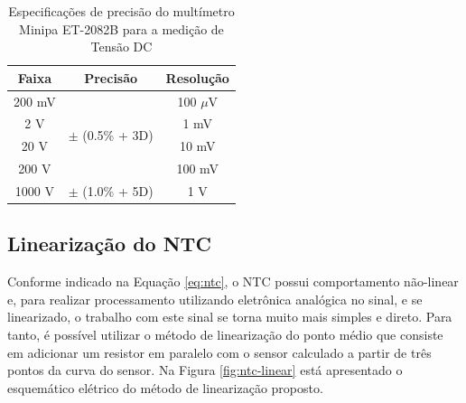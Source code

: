 \documentclass[a4paper]{instrumentacao}
\begin{document}
\begin{table}[H]
\centering
\caption{Especificações de precisão do multímetro Minipa ET-2082B para a medição de Tensão DC}
\label{tab:precisão-multimetro}
\begin{tabular}{|c|c|c|}
\hline
\textbf{Faixa} & \textbf{Precisão} & \textbf{Resolução} \\ \hline
200 mV         & \multirow{4}{*}{$\pm$ (0.5\% + 3D)} & 100 $\mu$V \\ \cline{1-1} \cline{3-3} 
2 V            &                              & 1 mV               \\ \cline{1-1} \cline{3-3} 
20 V           &                              & 10 mV              \\ \cline{1-1} \cline{3-3} 
200 V          &                              & 100 mV             \\ \hline
1000 V         & $\pm$ (1.0\% + 5D)           & 1 V                \\ \hline
\end{tabular}
\end{table}


\subsection{Linearização do NTC}
\label{sec:ntc-linearizacao}

Conforme indicado na Equação \ref{eq:ntc}, o NTC possui comportamento não-linear e, para realizar processamento utilizando eletrônica analógica no sinal, e se linearizado, o trabalho com este sinal se torna muito mais simples e direto. Para tanto, é possível utilizar o método de linearização do ponto médio que consiste em adicionar um resistor em paralelo com o sensor calculado a partir de três pontos da curva do sensor. Na Figura \ref{fig:ntc-linear} está apresentado o esquemático elétrico do método de linearização proposto.
\end{document}
